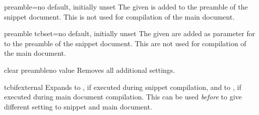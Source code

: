 \begin{extTcbKey}[][doc new=2015-03-11]{preamble}{=}{no default,
  initially unset}
  The given  is added to the preamble of the snippet document.
  This is not used for compilation of the main document.
\end{extTcbKey}


\begin{extTcbKey}[][doc new=2015-05-05]{preamble tcbset}{=}{no default,
  initially unset}
  The given  are added as parameter for 
  to the preamble of the snippet document.
  This are not used for compilation of the main document.
\end{extTcbKey}


\begin{extTcbKey}[][doc new=2015-03-16]{clear preamble}{}{no value}
  Removes all additional  settings.
\end{extTcbKey}



\begin{docCommand}[doc new=2015-03-11]{tcbifexternal}{}
  Expands to , if executed during snippet compilation,
  and to , if executed during main document compilation.
  This can be used \emph{before}  to
  give different setting to snippet and main document.
\begin{dispListing}
\tcbifexternal{
  \usepackage{onlyforexternal}
}{
  \usepackage{onlyformain}
}
\end{dispListing}
\end{docCommand}



